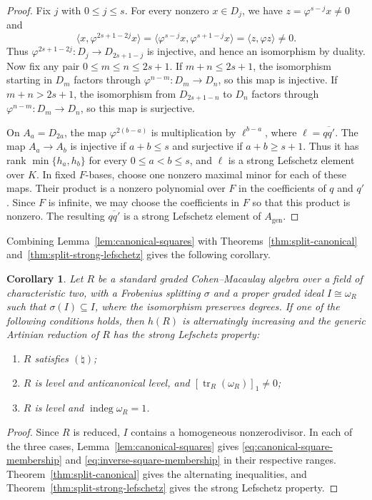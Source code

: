 \documentclass[a4paper,11pt]{amsart}
\DeclareMathOperator{\tr}{tr}
\DeclareMathOperator{\indeg}{indeg}
\newcommand{\natur}{\natural}
\newtheorem{corollary}[theorem]{Corollary}
\theoremstyle{definition}
\begin{document}
\begin{proof}
Fix $j$ with $0\le j\le s$. For every nonzero $x\in D_j$, we have $z=\varphi^{s-j}x\ne0$ and
\[
 \langle x,\varphi^{2s+1-2j}x\rangle=\langle\varphi^{s-j}x,\varphi^{s+1-j}x\rangle=\langle z,\varphi z\rangle\ne0.
\]
Thus $\varphi^{2s+1-2j}:D_j\to D_{2s+1-j}$ is injective, and hence an isomorphism by duality. Now fix any pair $0\le m\le n\le 2s+1$. If $m+n\le2s+1$, the isomorphism starting in $D_m$ factors through $\varphi^{n-m}\colon D_m\to D_n$, so this map is injective. If $m+n>2s+1$, the isomorphism from $D_{2s+1-n}$ to $D_n$ factors through $\varphi^{n-m}\colon D_m\to D_n$, so this map is surjective.

On $A_a=D_{2a}$, the map $\varphi^{2(b-a)}$ is multiplication by $\ell^{b-a}$, where $\ell=\overline{qq'}$. The map $A_a\to A_b$ is injective if $a+b\le s$ and surjective if $a+b\ge s+1$. Thus it has rank $\min\{h_a,h_b\}$ for every $0\le a<b\le s$, and $\ell$ is a strong Lefschetz element over $K$. In fixed $F$-bases, choose one nonzero maximal minor for each of these maps. Their product is a nonzero polynomial over $F$ in the coefficients of $q$ and $q'$. Since $F$ is infinite, we may choose the coefficients in $F$ so that this product is nonzero. The resulting $\overline{qq'}$ is a strong Lefschetz element of $A_{\mathrm{gen}}$.
\end{proof}

Combining Lemma~\ref{lem:canonical-squares} with Theorems~\ref{thm:split-canonical} and~\ref{thm:split-strong-lefschetz} gives the following corollary.

\begin{corollary}\label{cor:split-applications}
Let $R$ be a standard graded Cohen--Macaulay algebra over a field of characteristic two, with a Frobenius splitting $\sigma$ and a proper graded ideal $I\cong\omega_R$ such that $\sigma(I)\subseteq I$, where the isomorphism preserves degrees. If one of the following conditions holds, then $h(R)$ is alternatingly increasing and the generic Artinian reduction of $R$ has the strong Lefschetz property:
\begin{enumerate}
\item $R$ satisfies $(\natur)$;
\item $R$ is level and anticanonical level, and $[\tr_R(\omega_R)]_1\neq0$;
\item $R$ is level and $\indeg\omega_R=1$.
\end{enumerate}
\end{corollary}
\begin{proof}
Since $R$ is reduced, $I$ contains a homogeneous nonzerodivisor. In each of the three cases, Lemma~\ref{lem:canonical-squares} gives \eqref{eq:canonical-square-membership} and \eqref{eq:inverse-square-membership} in their respective ranges. Theorem~\ref{thm:split-canonical} gives the alternating inequalities, and Theorem~\ref{thm:split-strong-lefschetz} gives the strong Lefschetz property.
\end{proof}
\end{document}
